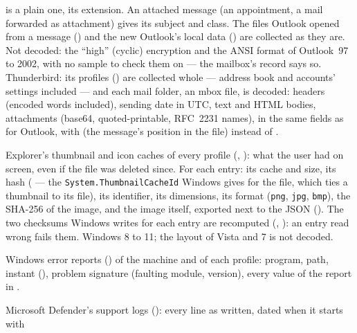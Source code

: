 \documentclass[11pt,a4paper,oneside]{report}
\begin{document}
\begin{description}[style=nextline,leftmargin=1.2em]
        is a plain one, its extension. An attached message (an appointment, a
        mail forwarded as attachment) gives its subject and class. The files
        Outlook opened from a message () and the new Outlook's local data
        ()
        are collected as they are. Not decoded: the ``high'' (cyclic)
        encryption and the ANSI format of Outlook~97 to 2002, with no sample to
        check them on — the mailbox's record says so. Thunderbird: its profiles
        ()
        are collected whole — address book and accounts' settings included —
        and each mail folder, an mbox file, is decoded: headers (encoded words
        included), sending date in UTC, text and HTML bodies, attachments
        (base64, quoted-printable, RFC~2231 names), in the same fields as for
        Outlook, with  (the message's position in the file)
        instead of .
  \item[\fichier{thumbcache.json}] Explorer's thumbnail and icon caches of
        every profile (, ):
        what the user had on screen, even if the file was deleted since. For
        each entry: its cache and size, its hash ( — the
        \texttt{System.ThumbnailCacheId} Windows gives for the file, which ties
        a thumbnail to its file), its identifier, its dimensions, its format
        (\texttt{png}, \texttt{jpg}, \texttt{bmp}), the SHA-256 of the image, and
        the image itself, exported next to the JSON
        ().
        The two checksums Windows writes for each entry are recomputed
        (, ): an entry read
        wrong fails them. Windows 8 to 11; the layout of Vista and 7 is not
        decoded.
  \item[\fichier{error\_reports.json}] Windows error reports
        () of the machine and of each profile: program, path,
        instant (), problem signature (faulting module,
        version), every value of the report in .
  \item[\fichier{defender\_log.json}] Microsoft Defender's support logs
        (): every line as written, dated when it starts with

\end{description}
\end{document}
